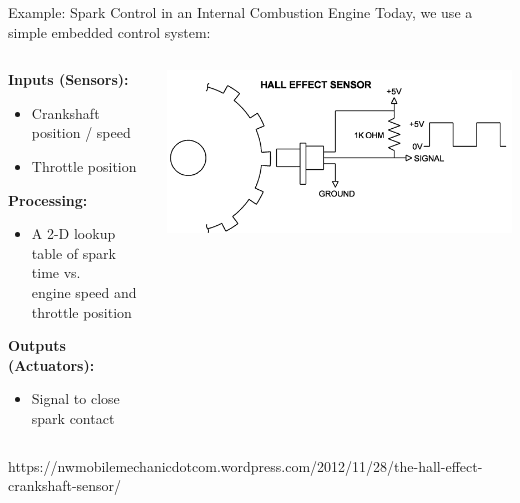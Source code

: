 \documentclass[aspectratio=169]{beamer}
\begin{document}
	\begin{frame}{Example: Spark Control in an Internal Combustion Engine}
		Today, we use a simple embedded control system:
		\vspace{2em}		
		\begin{columns}
		\begin{column}{0.45\textwidth}		
		{\bf Inputs (Sensors):}
		\begin{itemize}
			\item Crankshaft position / speed
			\item Throttle position
		\end{itemize}
		
		{\bf Processing:}
		\begin{itemize}
			\item A 2-D lookup table of spark time vs. \\
			engine speed and throttle position
		\end{itemize}
		
		{\bf Outputs (Actuators):}
		\begin{itemize}
			\item Signal to close spark contact
		\end{itemize}
		\end{column}
		\begin{column}{0.5\textwidth}
		\includegraphics[width=1.0\textwidth]{img/CKP_Sensor_Waveforms.png}
		\end{column}
		\end{columns}	
		\begin{flushright}
		\begin{tiny}https://nwmobilemechanicdotcom.wordpress.com/2012/11/28/the-hall-effect-crankshaft-sensor/\end{tiny}
		\end{flushright}
	\end{frame}
\end{document}
